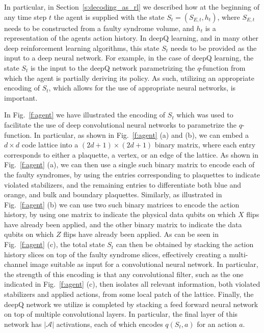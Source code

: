 \documentclass[twocolumn,preprintnumbers,amsmath,amssymb,notitlepage,nofootinbib,longbibliography,superscriptaddress,aps,pra,10pt]{revtex4-1}
\begin{document}
	In particular, in Section~\ref{s:decoding_as_rl} we described how at the beginning of any time step $t$ the agent is supplied with the state $S_{t}=(S_{E,{t}},h_{t})$, where $S_{E,{t}}$ needs to be constructed from a faulty syndrome volume, and $h_{t}$ is a representation of the agents action history.
	In deepQ learning, and in many other deep reinforcement learning algorithms, this state $S_t$ needs to be provided as the input to a deep neural network.
	For example, in the case of deepQ learning, the state $S_t$ is the input to the deepQ network parametrizing the $q$-function from which the agent is partially deriving its policy.
	As such, utilizing an appropriate encoding of $S_t$, which allows for the use of appropriate neural networks, is important.

	In Fig.~\ref{f:agent} we have illustrated the encoding of $S_t$ which was used to facilitate the use of deep convolutional neural networks to parametrize the $q$-function.
	In particular, as shown in Fig.~\ref{f:agent} (a) and (b), we can embed a $d\times d$ code lattice into a $(2d + 1)\times(2d+1)$ binary matrix, where each entry corresponds to either a plaquette, a vertex, or an edge of the lattice.
	As shown in Fig.~\ref{f:agent} (a), we can then use a single such binary matrix to encode each of the faulty syndromes, by using the entries corresponding to plaquettes to indicate violated stabilizers, and the remaining entries to differentiate both blue and orange, and bulk and boundary plaquettes.
	Similarly, as illustrated in  Fig.~\ref{f:agent} (b) we can use two such binary matrices to encode the action history, by using one matrix to indicate the physical data qubits on which $X$ flips have already been applied, and the other binary matrix to indicate the data qubits on which $Z$ flips have already been applied.
	As can be seen in Fig.~\ref{f:agent} (c), the total state $S_t$ can then be obtained by stacking the action history slices on top of the faulty syndrome slices, effectively creating a multi-channel image suitable as input for a convolutional neural network.
	In particular, the strength of this encoding is that any convolutional filter, such as the one indicated in Fig.~\ref{f:agent} (c), then isolates all relevant information, both violated stabilizers and applied actions, from some local patch of the lattice.
	Finally, the deepQ network we utilize is completed by stacking a feed forward neural network on top of multiple convolutional layers.
	In particular, the final layer of this network has $|\mathcal{A}|$ activations, each of which encodes $q(S_t,a)$ for an action $a$.
\end{document}
